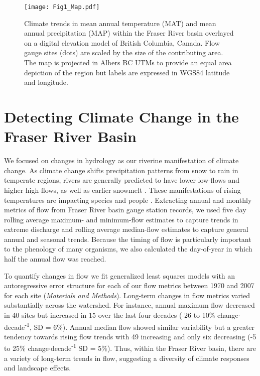 \documentclass[9pt,twocolumn,twoside,lineno]{pnas-new}
\begin{document}
\begin{figure*}[h]
\centering
\texttt{[image: Fig1\_Map.pdf]}
	\caption{Climate trends in mean annual temperature (MAT) and mean annual precipitation (MAP) within the Fraser River basin overlayed on a digital elevation model of British Columbia, Canada. Flow gauge sites (dots) are scaled by the size of the contributing area. The map is projected in Albers BC UTMs to provide an equal area depiction of the region but labels are expressed in WGS84 latitude and longitude.}
\label{fig:1}
\end{figure*}

\section*{Detecting Climate Change in the Fraser River Basin}
We focused on changes in hydrology as our riverine manifestation of climate change. As climate change shifts precipitation patterns from snow to rain in temperate regions, rivers are generally predicted to have lower low-flows and higher high-flows, as well as earlier snowmelt \cite{Nijssen:2001}. These manifestations of rising temperatures are impacting species \cite{Xenopoulos:2006} and people \cite{Hirabayashi:2013}. Extracting annual and monthly metrics of flow from Fraser River basin gauge station records, we used five day rolling average maximum- and minimum-flow estimates to capture trends in extreme discharge and rolling average median-flow estimates to capture general annual and seasonal trends. Because the timing of flow is particularly important to the phenology of many organisms, we also calculated the day-of-year in which half the annual flow was reached. 

To quantify changes in flow we fit generalized least squares models with an autoregressive error structure for each of our flow metrics between 1970 and 2007 for each site (\textit{Materials and Methods}). Long-term changes in flow metrics varied substantially across the watershed. For instance, annual maximum flow decreased in 40 sites but increased in 15 over the last four decades (-26 to 10\% change$\cdot$decade\textsuperscript{-1}, SD = 6\%). Annual median flow showed similar variability but a greater tendency towards rising flow trends with 49 increasing and only six decreasing (-5 to 25\% change$\cdot$decade\textsuperscript{-1} SD = 5\%). Thus, within the Fraser River basin, there are a variety of long-term trends in flow, suggesting a diversity of climate responses and landscape effects.
\end{document}
